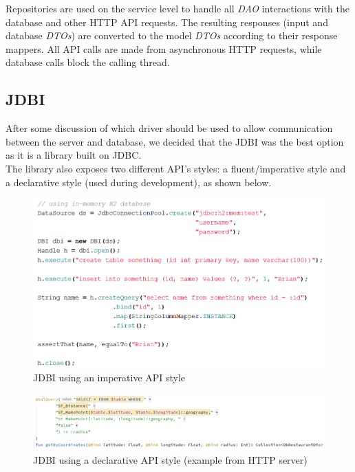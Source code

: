 Repositories are used on the service level to handle all \textit{DAO} interactions with
the database and other HTTP API requests. The resulting responses (input and database \textit{DTOs})
are converted to the model \textit{DTOs} according to their response mappers.
All API calls are made from asynchronous HTTP requests, while database calls block the calling thread.\\

\subsection{JDBI}

After some discussion of which driver should be used to allow communication between the server and database, we decided that the JDBI\cite{jdbi} was the best
option as it is a library built on JDBC\cite{jdbc}.\\

The library also exposes two different API's styles: a fluent/imperative style and a declarative style (used during development), as shown below.

\begin{figure}[H]
    \begin{center}
        \includegraphics[scale=0.5]{_figures/fluentApiJdbi.png}
        \caption{JDBI using an imperative API style}
    \end{center}
\end{figure}

\begin{figure}[H]
    \begin{center}
        \includegraphics[scale=0.5]{_figures/sqlObjectJdbi.png}
        \caption{JDBI using a declarative API style (example from HTTP server)}
    \end{center}
\end{figure}

